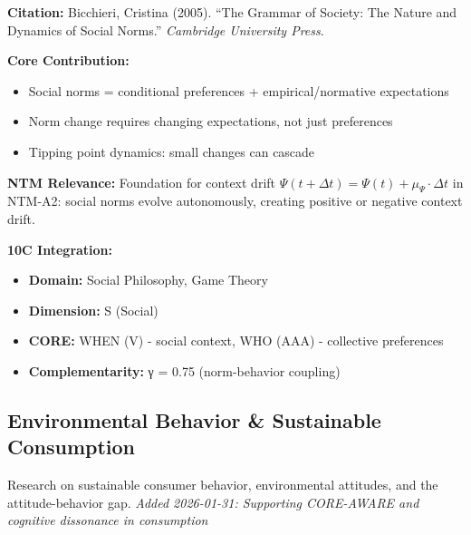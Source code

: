 \begin{tcolorbox}[colback=yellow!5!white,colframe=yellow!75!black,title=Key Paper: Bicchieri (2005)]
\textbf{Citation:} Bicchieri, Cristina (2005). ``The Grammar of Society: The Nature and Dynamics of Social Norms.'' \textit{Cambridge University Press}.

\textbf{Core Contribution:}
\begin{itemize}[nosep]
    \item Social norms = conditional preferences + empirical/normative expectations
    \item Norm change requires changing expectations, not just preferences
    \item Tipping point dynamics: small changes can cascade
\end{itemize}

\textbf{NTM Relevance:} Foundation for context drift $\Psi(t + \Delta t) = \Psi(t) + \mu_{\Psi} \cdot \Delta t$ in NTM-A2: social norms evolve autonomously, creating positive or negative context drift.

\textbf{10C Integration:}
\begin{itemize}[nosep]
    \item \textbf{Domain:} Social Philosophy, Game Theory
    \item \textbf{Dimension:} S (Social)
    \item \textbf{CORE:} WHEN (V) - social context, WHO (AAA) - collective preferences
    \item \textbf{Complementarity:} γ = 0.75 (norm-behavior coupling)
\end{itemize}
\end{tcolorbox}

\subsection{Environmental Behavior \& Sustainable Consumption}
\label{subsec:ot-environmental}

Research on sustainable consumer behavior, environmental attitudes, and the attitude-behavior gap.
\textit{Added 2026-01-31: Supporting CORE-AWARE and cognitive dissonance in consumption}

